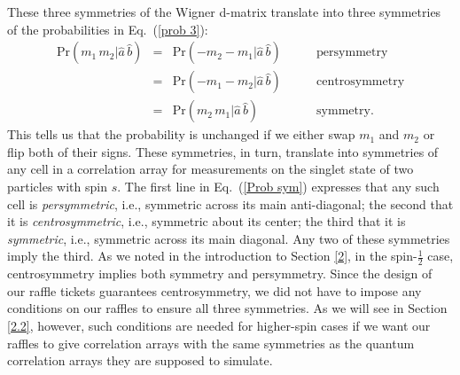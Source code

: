 These three symmetries of the Wigner d-matrix translate into three symmetries of the probabilities in Eq.\ (\ref{prob 3}):
\begin{equation}
\begin{array}{lcll}
\mathrm{Pr}(m_1 \, m_2 | \hat{a}\,\hat{b} ) & \!\!\! =  \!\!\! & \mathrm{Pr}(-m_2  -\!m_1 | \hat{a}\,\hat{b}) & \quad \quad {\mathrm{persymmetry}} \\[.3 cm]
  & \!\!\! =  \!\!\! & \mathrm{Pr}(-m_1  -\!m_2 | \hat{a}\,\hat{b}) & \quad \quad {\mathrm{centrosymmetry}}  \\[.3 cm]
  & \!\!\! =  \!\!\! & \mathrm{Pr}(m_2 \, m_1 | \hat{a}\,\hat{b} ) & \quad \quad {\mathrm{symmetry}}.    
\end{array}
\label{Prob sym}
\end{equation}
This tells us that the probability is unchanged if we either swap $m_1$ and $m_2$ or flip both of their signs. These symmetries, in turn, translate into symmetries of any cell in a correlation array for measurements on the singlet state of two particles with spin $s$. The first line in Eq.\ (\ref{Prob sym}) expresses that any such cell is \emph{persymmetric}, i.e., symmetric across its main anti-diagonal; the second that it is \emph{centrosymmetric}, i.e., symmetric about its center; the third that it is \emph{symmetric}, i.e., symmetric across its main diagonal. Any two of these symmetries imply the third. As we noted in the introduction to Section \ref{2}, in the spin-$\frac12$ case, centrosymmetry implies both symmetry and persymmetry. Since the design of our raffle tickets guarantees centrosymmetry, we did not have to impose any conditions on our raffles to ensure all three symmetries. As we will see in Section \ref{2.2}, however, such conditions are needed for higher-spin cases if we want our raffles to give correlation arrays with the same symmetries as the quantum correlation arrays they are supposed to simulate. 
